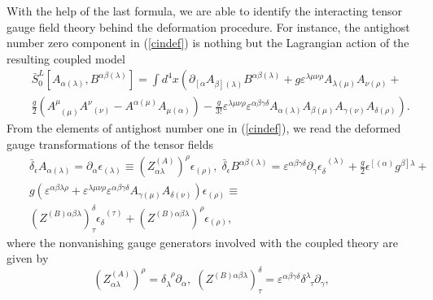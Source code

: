 \documentclass[a4paper,12pt]{article}
\begin{document}
With the help of the last formula, we are able to identify the interacting
tensor gauge field theory behind the deformation procedure. For instance,
the antighost number zero component in (\ref{cindef}) is nothing but the
Lagrangian action of the resulting coupled model
\begin{eqnarray}
&&\bar{S}_{0}^{L}\left[ A_{\alpha (\lambda )},B^{\alpha \beta
(\lambda )}\right] =\int d^{4}x\left( \partial _{\left[ \alpha
\right. }A_{\left. \beta \right] (\lambda )}B^{\alpha \beta
(\lambda )}+g\varepsilon ^{\lambda \mu \nu \rho }A_{\lambda (\mu
)}A_{\nu (\rho )}+\right. \nonumber \\
&&\left. \frac{g}{2}\left( A_{\;\;(\mu )}^{\mu }A_{\;\;(\nu
)}^{\nu }-A^{\alpha (\mu )}A_{\mu (\alpha )}\right)
-\frac{g}{3!}\varepsilon ^{\lambda \mu \nu \rho }\varepsilon
^{\alpha \beta \gamma \delta }A_{\alpha (\lambda )}A_{\beta (\mu
)}A_{\gamma (\nu )}A_{\delta (\rho )}\right) . \label{cin30}
\end{eqnarray}
From the elements of antighost number one in (\ref{cindef}), we
read the deformed gauge transformations of the tensor fields
\begin{eqnarray}
&&\bar{\delta}_{\epsilon }A_{\alpha (\lambda )}=\partial _{\alpha
}\epsilon _{(\lambda )}\equiv \left( Z_{\alpha \lambda
}^{(A)}\right) ^{\rho }\epsilon _{(\rho
)},\;\bar{\delta}_{\epsilon }B^{\alpha \beta (\lambda
)}=\varepsilon ^{\alpha \beta \gamma \delta }\partial _{\gamma
}\epsilon _{\delta }^{\;\;(\lambda )}+\frac{g}{2}\epsilon ^{\left[
(\alpha )\right. }g^{\left. \beta \right] \lambda }+ \nonumber \\
&&g\left( \varepsilon ^{\alpha \beta \lambda \rho }+\varepsilon
^{\lambda \mu \nu \rho }\varepsilon ^{\alpha \beta \gamma \delta
}A_{\gamma (\mu )}A_{\delta (\nu )}\right) \epsilon _{(\rho
)}\equiv \nonumber \\
&&\left( Z^{(B)\alpha \beta \lambda }\right)
_{\tau }^{\delta }\epsilon _{\delta }^{\;\;(\tau )}+\left(
Z^{(B)\alpha \beta \lambda }\right) ^{\rho }\epsilon _{(\rho )},
\label{cin31}
\end{eqnarray}
where the nonvanishing gauge generators involved with the coupled theory are
given by
\begin{equation}
\left( Z_{\alpha \lambda }^{(A)}\right) ^{\rho }=\delta _{\lambda
}^{\;\;\rho }\partial _{\alpha },\;\left( Z^{(B)\alpha \beta \lambda
}\right) _{\tau }^{\delta }=\varepsilon ^{\alpha \beta \gamma \delta }\delta
_{\;\;\tau }^{\lambda }\partial _{\gamma },  \label{cin34}
\end{equation}
\end{document}

